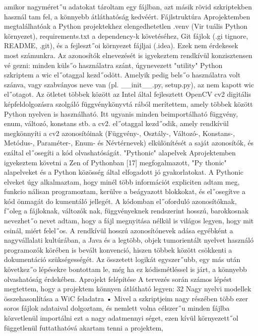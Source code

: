 \documentclass[12pt]{report}
\theoremstyle{definition}
\begin{document}
 amikor nagyméret˝u adatokat tároltam egy fájlban, azt másik rövid szkriptekben használ
tam fel, a könnyebb átláthatóság kedvéért.
 Fájlstruktúra
 Aprojektemben megtalálhatóak a Python projektekhez elengedhetetlen .venv (Vir
tuális Python környezet), requirements.txt a dependency-k követéséhez, Git fájlok (.gi
tignore, README, .git), és a fejleszt˝oi környezet fájljai (.idea). Ezek nem érdekesek
 most számunkra. Az azonosítók elnevezését is igyekeztem rendkívül konzisztensen vé
gezni: minden küls˝o használatra szánt, úgynevezett "utility" Python szkriptem a wic
 el˝otaggal kezd˝odött. Amelyik pedig bels˝o használatra volt szánva, vagy szabványos neve
 van (pl. __init__.py, setup.py), az nem kapott wic el˝otagot. Az ötletet többek között az
 Intel által fejlesztett OpenCV cv2 digitális képfeldolgozásra szolgáló függvénykönyvtá
rából merítettem, amely többek között Python nyelven is használható. Itt ugyanis minden
 beimportálható függvény, enum, változó, konstans stb. a cv2. el˝otaggal kezd˝odik, amely
 rendkívül megkönnyíti a cv2 azonosítóinak (Függvény-, Osztály-, Változó-, Konstans-,
 Metódus-, Paraméter-, Enum- és Névtérnevek) elkülönítését a saját azonosítók, és ezáltal
 el˝osegíti a kód olvashatóságát.
 "Pythonic" alapelvek
 Aprojektemben igyekeztem követni a Zen of Pythonban [17] megfogalmazott, "Py
thonic" alapelveket és a Python közösség által elfogadott jó gyakorlatokat. A Pythonic
 elveket úgy alkalmaztam, hogy minél több információt expliciten adtam meg, funkcio
nálisan programoztam, kerülve a beágyazott blokkokat, és el˝osegítve a kód önmagát do
kumentáló jellegét. A kódomban el˝oforduló azonosítóknak, f˝oleg a fájloknak, változók
nak, függvényeknek rendszerint hosszú, barokkosnak nevezhet˝o nevet adtam, hogy a fájl
 megnyitása nélkül is világos legyen, hogy mit csinál, miért felel˝os. A rendkívül hosszú
 azonosítónevek adása egyébként a nagyvállalati kultúrában, a Java és a legtöbb, objek
tumorientált nyelvet használó programozók körében is bevált konvenció, hiszen többek
 között csökkenti a dokumentáció szükségességét. Az összetett logikát egyszer˝ubb, egy
más után következ˝o lépésekre bontottam le, még ha ez kódismétléssel is járt, a könnyebb
 olvashatóság érdekében.
 Aprojekt felépítése
 A tervezés során számos lépést megtettem, hogy a projektem könnyen átlátható
 legyen:
 32
Nagy nyelvi modellek összehasonlítása a WiC feladatra
 • Mivel a szkriptjeim nagy részében több ezer soros fájlok adataival dolgoztam, és
 nemlett volna célszer˝u minden fájlba közvetlenül importálni ezt a nagy adatmennyi
séget, ezen kívül környezett˝ol függetlenül futtathatóvá akartam tenni a projektem,
\end{document}
